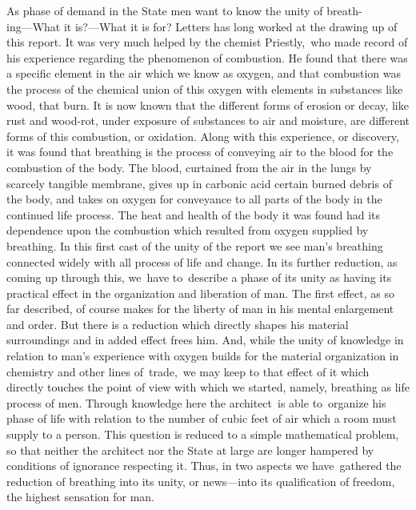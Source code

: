 \documentclass[twoside,symmetric,nobib,justified]{tufte-book}
\begin{document}
As phase of demand in the State men want to know the unity of
breath-\\\noindent ing---What it is?---What it is for? Letters has long worked at the
drawing up of this report. It was very much helped by the chemist
Priestly,~who made record of his experience regarding the phenomenon of
combustion. He found that there was a specific element in the air which
we know as oxygen, and that combustion was the process of the chemical
union of this oxygen with elements in substances like wood, that burn.
It is now known that the different forms of erosion or decay, like rust
and wood-rot, under exposure of substances to air and moisture, are
different forms of this combustion, or oxidation. Along with this
experience, or discovery, it was found that breathing is the process of
conveying air to the blood for the combustion of the body. The blood,
curtained from the air in the lungs by scarcely tangible membrane, gives
up in carbonic acid certain burned debris of the body, and takes on
oxygen for conveyance to all parts of the body in the continued life
process. The heat and health of the body it was found had its dependence
upon the combustion which resulted from oxygen supplied by breathing. In
this first cast of the unity of the report we see man's breathing
connected widely with all process of life and change. In its further
reduction, as coming up through this, we~have to~describe a phase of its
unity as having its practical effect in the organization and liberation
of man. The first effect, as so far described, of course makes for the
liberty of man in his mental enlargement and order. But there is a
reduction which directly shapes his material surroundings and in added
effect frees him. And, while the unity of knowledge in relation to man's
experience with oxygen builds for the material organization in chemistry
and other lines of~trade,~we may keep to that effect of it which
directly touches the point of view with which we started, namely,
breathing as life process of men. Through knowledge here the
architect~is able to~organize his phase of life with relation to the
number of cubic feet of air which a room must supply to a person. This
question is reduced to a simple mathematical problem, so that neither
the architect nor the State at large are longer hampered by conditions
of ignorance respecting it. Thus, in two aspects we have~gathered the
reduction of breathing into its unity, or news---into its qualification
of freedom, the highest sensation for man.~
\end{document}
